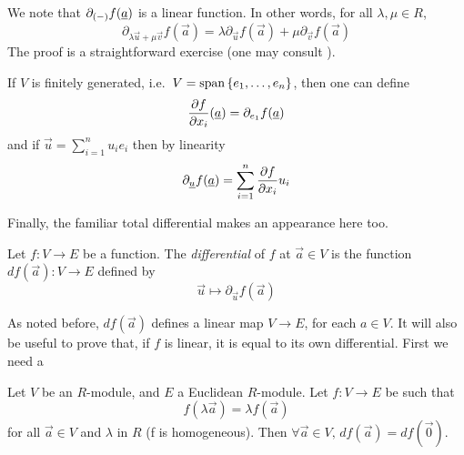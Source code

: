 We note that \( \partial_{(-)}f(\underline a) \) is a linear function. In other words, for all \( \lambda,\mu \in R\),
\begin{equation*}
  \partial_{\lambda \vec u + \mu \vec v}f(\vec a) = \lambda\partial_{\vec u}f(\vec a) + \mu\partial_{\vec v}f(\vec a)
\end{equation*}
The proof is a straightforward exercise (one may consult \cite[p. 13]{lav96}).

If \( V \) is finitely generated, i.e.\ \( V = \operatorname{span}{\{e_1,\dots,e_n\}} \), then one can define
\begin{equation*}
  \frac{\partial f}{\partial x_i}(\underline a) = \partial_{e_1}f(\underline a)
\end{equation*}
and if \( \vec u = \sum_{i=1}^{n}{u_ie_i} \) then by linearity
\begin{equation*}
  \partial_{\underline u}f(\underline a) = \sum_{i=1}^{n}\frac{\partial f}{\partial x_i}u_i
\end{equation*}

Finally, the familiar total differential makes an appearance here too.

\begin{defn}
  Let \( f:V\to E \) be a function. The \emph{differential} of \( f \) at \( \vec a\in V \) is the function \( df(\vec a):V\to E \) defined by
  \begin{equation*}
    \vec u\mapsto \partial_{\vec u}f(\vec a)
  \end{equation*}
  \label{def:df(a)}
\end{defn}

As noted before, \( df(\vec a) \) defines a linear map \( V\to E \), for each \( a\in V \). It will also be useful to prove that, if \( f \) is linear, it is equal to its own differential. First we need a

\begin{lemma}
  Let \( V \) be an \( R \)-module, and \( E \) a Euclidean \( R \)-module. Let \( f:V\to E \) be such that
  \begin{equation*}
    f(\lambda \vec a) = \lambda f(\vec a)
  \end{equation*}
  for all \( \vec a\in V \) and \( \lambda \) in \( R \) (f is homogeneous). Then \( \forall \vec a\in V,\, df(\vec a) = df(\vec 0) \).
  \label{lm:homg}
\end{lemma}

